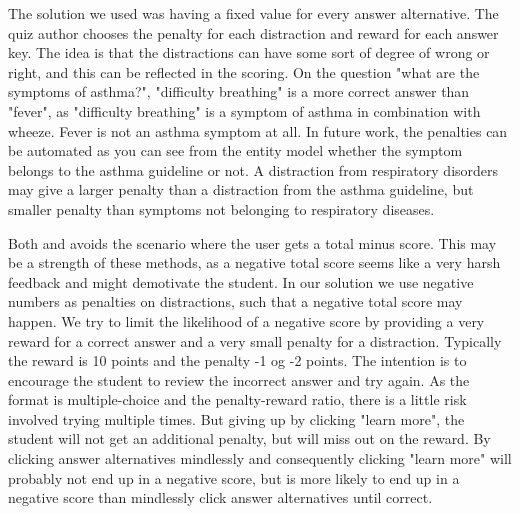 \documentclass[a4paper,12pt]{book}
\begin{document}
The solution we used was having a fixed value for every answer alternative. The quiz author chooses the penalty for each distraction and reward for each answer key. The idea is that the distractions can have some sort of degree of wrong or right, and this can be reflected in the scoring. On the question "what are the symptoms of asthma?", "difficulty breathing" is a more correct answer than "fever", as "difficulty breathing" is a symptom of asthma in combination with wheeze. Fever is not an asthma symptom at all. In future work, the penalties can be automated as you can see from the entity model whether the symptom belongs to the asthma guideline or not. A distraction from respiratory disorders may give a larger penalty than a distraction from the asthma guideline, but smaller penalty than symptoms not belonging to respiratory diseases.

Both \textcite{Attali2015} and \textcite{Morrison1995} avoids the scenario where the user gets a total minus score. This may be a strength of these methods, as a negative total score seems like a very harsh feedback and might demotivate the student. In our solution we use negative numbers as penalties on distractions, such that a negative total score may happen. We try to limit the likelihood of a negative score by providing a very reward for a correct answer and a very small penalty for a distraction. Typically the reward is 10 points and the penalty -1 og -2 points. The intention is to encourage the student to review the incorrect answer and try again. As the format is multiple-choice and the penalty-reward ratio, there is a little risk involved trying multiple times. But giving up by clicking "learn more", the student will not get an additional penalty, but will miss out on the reward. By clicking answer alternatives mindlessly and consequently clicking "learn more" will probably not end up in a negative score, but is more likely to end up in a negative score than mindlessly click answer alternatives until correct.

\end{document}
